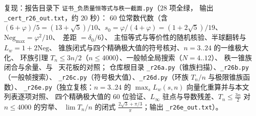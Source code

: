 复现：报告目录下 \texttt{证书\_负质量恒等式与秩一截面.py}（$28$ 项全绿，
输出 \texttt{\_cert\_r26\_out.txt}，约 $20$ 秒）：
$60$ 位常数代数（含 $(6+\varphi)/5=(13+\sqrt5)/10$、$s_0=\varphi/(4+\varphi)=(1+2\sqrt5)/19$、
$\mathrm{Neg}_{\max}=\varphi^2/10$、\STW\ 差距 $=\delta_0/6$）、
主恒等式与等价性的随机核验、半球翻转与 $L_w=1+2\mathrm{Neg}$、
锥族闭式与四个精确极大值的符号核对、$n=3..24$ 的一维极大化、
环族引理 $T_n\le3n/2$（$n\le4000$）、一般帧全局搜索（$N=4..12$）、
秩一锥族闭合与余量、与 \STW\ 天花板的对照；
仓库根目录 \texttt{\_r26a.py}（锥族扫描）、\texttt{\_r26b.py}（一般帧搜索）、
\texttt{\_r26c.py}（符号极大值）、\texttt{\_r26d.py}（环族 $T_n/n$ 与极限锥族函数）、
\texttt{\_r26e.py}（独立复核：$n=3..24$ 的 $\max_sL_w(s,n)$ 向量化重算并与本文列表逐项对照、
四个精确极大值的 $60$ 位验证、$L_\infty$ 驻点与导数残差、$T_n\le\frac{3n}2$ 对 $n\le4000$ 的穷举、
$\lim T_n/n$ 的闭式 $\frac{2\sqrt3+\pi/3}{\pi}$；输出 \texttt{\_r26e\_out.txt}）。
